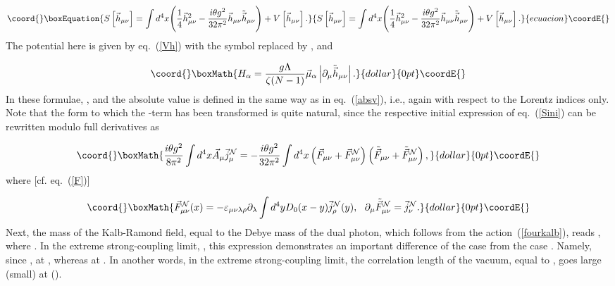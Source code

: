 \documentclass[a4paper,12pt]{article}
\begin{document}
\begin{equation}\coord{}\boxEquation{
\label{fourkalb}
S\left[\vec h_{\mu\nu}\right]=\int d^4x\Biggl(\frac{1}{4}\vec h_{\mu\nu}^2-\frac{i\theta g^2}{32\pi^2}
\vec h_{\mu\nu}\tilde{\vec h}_{\mu\nu}\Biggr)+V\left[\vec h_{\mu\nu}\right].
}{
S\left[\vec h_{\mu\nu}\right]=\int d^4x\Biggl(\frac{1}{4}\vec h_{\mu\nu}^2-\frac{i\theta g^2}{32\pi^2}
\vec h_{\mu\nu}\tilde{\vec h}_{\mu\nu}\Biggr)+V\left[\vec h_{\mu\nu}\right].
}{ecuacion}\coordE{}\end{equation}
The potential \coordHE{} here is given by eq.~(\ref{Vh}) with the symbol \coordHE{} replaced by \coordHE{}, and


$$\coord{}\boxMath{H_\alpha=\frac{g\Lambda}{\zeta(N-1)}\vec\mu_\alpha\left|\partial_\mu\tilde{\vec h}_{\mu\nu}\right|.}{dollar}{0pt}\coordE{}$$
In these formulae,
\coordHE{},
and the absolute value is defined in the same way as in eq.~(\ref{absv}), i.e., again with respect to the Lorentz indices only.
Note that the form to which the \myHighlight{$\theta$}\coordHE{}-term has been transformed is quite natural, since
the respective initial expression of eq.~(\ref{Sini}) can be rewritten modulo full derivatives as

$$\coord{}\boxMath{
\frac{i\theta g^2}{8\pi^2}
\int d^4x\vec A_\mu\vec j_\mu^{\cal N}=-\frac{i\theta g^2}{32\pi^2}\int d^4x
\left(\vec F_{\mu\nu}+\vec F_{\mu\nu}^{\cal N}\right)\left(
\tilde{\vec F}_{\mu\nu}+\tilde{\vec F}_{\mu\nu}^{\cal N}\right),}{dollar}{0pt}\coordE{}$$
where [cf. eq.~(\ref{F})]

$$\coord{}\boxMath{
\vec F_{\mu\nu}^{\cal N}(x)=-\varepsilon_{\mu\nu\lambda\rho}\partial_\lambda\int d^4yD_0(x-y)\vec j_\rho^{\cal N}(y),~~
\partial_\mu\tilde{\vec F}_{\mu\nu}^{\cal N}=\vec j_\nu^{\cal N}.}{dollar}{0pt}\coordE{}$$
Next, the mass of the Kalb-Ramond field, equal to
the Debye mass of the dual photon,
which follows from the action~(\ref{fourkalb}), reads \coordHE{},
where \coordHE{}. In the extreme strong-coupling limit, \coordHE{}, this expression demonstrates an important
difference of the case \coordHE{} from the case \coordHE{}. Namely, since \coordHE{},
\coordHE{} at \coordHE{}, whereas \coordHE{} at \coordHE{}. In another words, in the extreme strong-coupling limit, the correlation
length of the vacuum, equal to \coordHE{}, goes large (small) at \coordHE{} (\coordHE{}).
\end{document}
